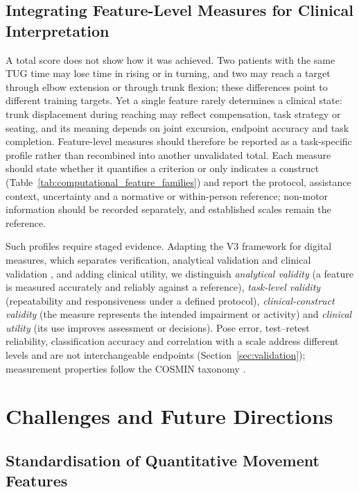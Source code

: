 \documentclass[11pt]{article}
\begin{document}
\subsection{Integrating Feature-Level Measures for Clinical Interpretation}
A total score does not show how it was achieved. Two patients with the same TUG time may lose time in rising or in turning, and two may reach a target through elbow extension or through trunk flexion; these differences point to different training targets. Yet a single feature rarely determines a clinical state: trunk displacement during reaching may reflect compensation, task strategy or seating, and its meaning depends on joint excursion, endpoint accuracy and task completion. Feature-level measures should therefore be reported as a task-specific profile rather than recombined into another unvalidated total. Each measure should state whether it quantifies a criterion or only indicates a construct (Table~\ref{tab:computational_feature_families}) and report the protocol, assistance context, uncertainty and a normative or within-person reference; non-motor information should be recorded separately, and established scales remain the reference.

Such profiles require staged evidence. Adapting the V3 framework for digital measures, which separates verification, analytical validation and clinical validation \cite{Goldsack2020V3}, and adding clinical utility, we distinguish \emph{analytical validity} (a feature is measured accurately and reliably against a reference), \emph{task-level validity} (repeatability and responsiveness under a defined protocol), \emph{clinical-construct validity} (the measure represents the intended impairment or activity) and \emph{clinical utility} (its use improves assessment or decisions). Pose error, test--retest reliability, classification accuracy and correlation with a scale address different levels and are not interchangeable endpoints (Section~\ref{sec:validation}); measurement properties follow the COSMIN taxonomy \cite{Mokkink2010COSMINTaxonomy}.

\section{Challenges and Future Directions}
\label{sec:challenge}

\subsection{Standardisation of Quantitative Movement Features}
\end{document}
